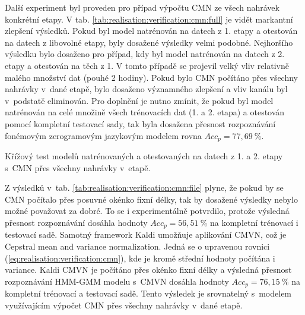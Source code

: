 Další experiment byl proveden pro případ výpočtu CMN ze všech nahrávek konkrétní etapy.
V tab. \ref{tab:realisation:verification:cmn:full} je vidět markantní zlepšení výsledků.
Pokud byl model natrénován na datech z 1. etapy a otestován na datech z libovolné etapy, byly dosažené výsledky velmi podobné.
Nejhoršího výsledku bylo dosaženo pro případ, kdy byl model natrénován na datech z 2. etapy a otestován na těch z 1.
V tomto případě se projevil velký vliv relativně malého množství dat (pouhé 2 hodiny).
Pokud bylo CMN počítáno přes všechny nahrávky v~dané etapě, bylo dosaženo významného zlepšení a vliv kanálu byl v~podstatě eliminován.
Pro doplnění je nutno zmínit, že pokud byl model natrénován na celé množině všech trénovacích dat (1. a 2. etapa) a otestován pomocí kompletní testovací sady, tak byla dosažena přesnost rozpoznávání fonémovým zerogramovým jazykovým modelem rovna $Acc_{p} = 77,69~\%$.


\begin{table}[htpb]
  \centering
  \def\arraystretch{1.5}
  \caption[Křížový test s~CMN přes všechny nahrávky]{Křížový test modelů natrénovaných a otestovaných na datech z 1. a 2. etapy s~CMN  přes všechny nahrávky v~etapě.}
  \label{tab:realisation:verification:cmn:full}
\end{table}

Z výsledků v~tab. \ref{tab:realisation:verification:cmn:file} plyne, že pokud by se CMN počítalo přes posuvné okénko fixní délky, tak by dosažené výsledky nebylo možné považovat za dobré.
To se i experimentálně potvrdilo, protože výsledná přesnost rozpoznávání dosáhla hodnoty $Acc_{p} = 56,51~\%$ na kompletní trénovací i testovací sadě.
Samotný framework Kaldi umožňuje aplikování CMVN, což je Cepstral mean and variance normalization.
Jedná se o upravenou rovnici (\ref{eq:realisation:verification:cmn}), kde je kromě střední hodnoty počítána i variance.
Kaldi CMVN je počítáno přes okénko fixní délky a výsledná přesnost rozpoznávání HMM-GMM modelu s~CMVN dosáhla hodnoty $Acc_{p} = 76,15~\%$ na kompletní trénovací a testovací sadě.
Tento výsledek je srovnatelný s~modelem využívajícím výpočet CMN přes všechny nahrávky v~dané etapě.

